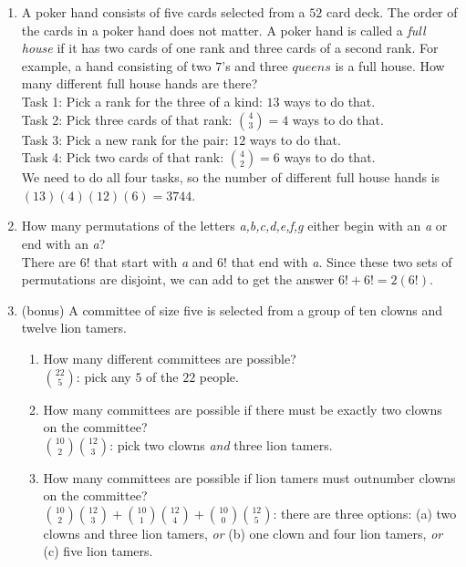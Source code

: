 \documentclass[11pt]{amsart}
\begin{document}
\begin{enumerate}
\vfill\break

\item A poker hand consists of five cards selected from a $52$ card deck. The order of the cards in a poker hand does not matter. A poker hand is called a {\it full house} if it has two cards of one rank and three cards of a second rank. For example, a hand consisting of two $7$'s and three $queens$ is a full house. How many different full house hands are there?\\[3pt]

{\color{blue}
Task 1: Pick a rank for the three of a kind: $13$ ways to do that.\\[3pt]
Task 2: Pick three cards of that rank: $\binom{4}{3} = 4$ ways to do that.\\[3pt]
Task 3: Pick a new rank for the pair: $12$ ways to do that.\\[3pt]
Task 4: Pick two cards of that rank: $\binom{4}{2} = 6$ ways to do that.\\[3pt]
We need to do all four tasks, so the number of different full house hands is
$(13)(4)(12)(6) = 3744$.\\[5pt]
}

\item How many permutations of the letters {\itshape a,b,c,d,e,f,g} either begin with an {\it a} or end with an {\it a}?\\[3pt]
{\color{blue} There are $6!$ that start with {\itshape a} and $6!$ that end with {\itshape a}. Since these
two sets of permutations are disjoint, we can add to get the answer $6!+6! = 2(6!)$.\\[5pt]
}

\item (bonus) A committee of size five is selected from a group of ten clowns and
twelve  lion tamers.\\[3pt]


\begin{enumerate}
\item How many different committees are possible?\\[3pt]
{\color{blue}
$\binom{22}{5}$: pick any $5$ of the $22$ people.\\[3pt] 
}


\item How many committees are possible if there must be exactly two clowns
on the committee?\\[3pt]
{\color{blue}
$\binom{10}{2}\binom{12}{3}$: pick two clowns {\itshape and } three lion tamers.\\[3pt]
}

\item How many committees are possible if lion tamers must outnumber clowns
on the committee?\\[3pt]
{\color{blue}
$\binom{10}{2}\binom{12}{3} + \binom{10}{1}\binom{12}{4}+\binom{10}{0}\binom{12}{5}$:
there are three options: (a) two clowns and three lion tamers, {\itshape or } (b) one clown and four lion tamers,   {\itshape or } (c) five lion tamers.\\[5pt]
}

\end{enumerate}

\end{enumerate}
\end{document}

